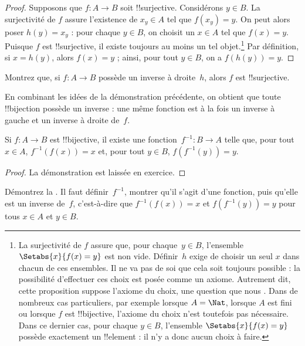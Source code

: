 \documentclass[../../../include/open-logic-section]{subfiles}
\begin{document}
\begin{proof}
Supposons que $f\colon A \to B$ soit !!{surjective}. Considérons
$y \in B$. La surjectivité de $f$ assure l’existence de $x_y \in A$
tel que $f(x_y) = y$. On peut alors poser $h(y) = x_y$ : pour chaque
$y \in B$, on choisit un $x \in A$ tel que $f(x) = y$.
Puisque $f$ est !!{surjective}, il existe toujours au moins un tel
objet.\footnote{La surjectivité de $f$ assure que, pour chaque~$y \in B$,
l’ensemble $\Setabs{x}{f(x) = y}$ est non vide. Définir~$h$ exige de
choisir un seul $x$ dans chacun de ces ensembles. Il ne va pas de soi
que cela soit toujours possible : la possibilité d’effectuer ces choix
est posée comme un axiome. Autrement dit, cette proposition suppose
l’axiome du choix, une question que nous
.
Dans de nombreux cas particuliers, par exemple lorsque $A = \Nat$,
lorsque $A$ est fini ou lorsque $f$ est !!{bijective}, l’axiome du choix
n’est toutefois pas nécessaire. Dans ce dernier cas, pour chaque $y \in B$,
l’ensemble $\Setabs{x}{f(x) = y}$ possède exactement un !!{element} :
il n’y a donc aucun choix à faire.}
Par définition, si $x = h(y)$, alors $f(x) = y$ ; ainsi,
pour tout $y \in B$, on a $f(h(y)) = y$.
\end{proof}

\begin{prob}
Montrez que, si $f\colon A \to B$ possède un inverse à droite~$h$,
alors $f$ est !!{surjective}.
\end{prob}

\begin{explain}
En combinant les idées de la démonstration précédente, on obtient que
toute !!{bijection} possède un inverse : une même fonction est à la fois
un inverse à gauche et un inverse à droite de~$f$.
\end{explain}

\begin{prop}
Si $f\colon A \to B$ est !!{bijective}, il existe une
fonction~$f^{-1}\colon B \to A$ telle que, pour tout $x \in A$,
$f^{-1}(f(x)) = x$ et, pour tout $y \in B$, $f(f^{-1}(y)) = y$.
\end{prop}

\begin{proof}
La démonstration est laissée en exercice.
\end{proof}

\begin{prob}
Démontrez la .
Il faut définir~$f^{-1}$, montrer qu’il s’agit d’une fonction, puis
qu’elle est un inverse de~$f$, c’est-à-dire que $f^{-1}(f(x)) = x$ et
$f(f^{-1}(y)) = y$ pour tous $x \in A$ et $y \in B$.
\end{prob}
\end{document}
